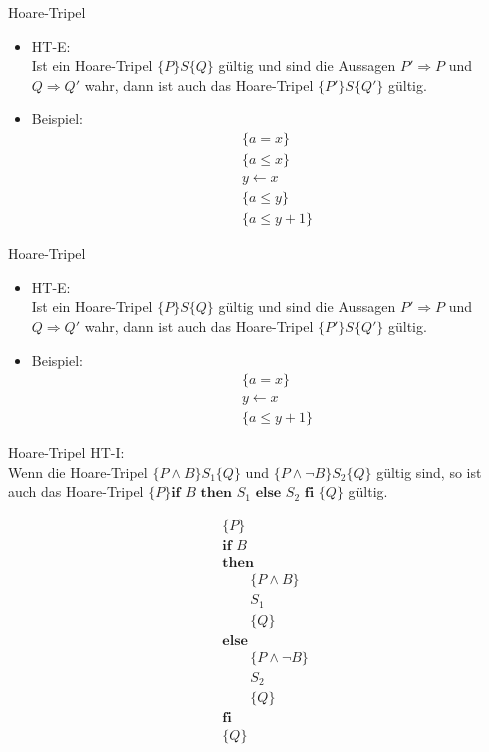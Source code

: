 \begin{frame}{Hoare-Tripel}
  \begin{itemize}
    \item HT-E:\\
      Ist ein Hoare-Tripel $\{P\}S\{Q\}$ gültig und sind die
      Aussagen $P' \Rightarrow P$ und $Q\Rightarrow Q'$ wahr, dann ist auch das
      Hoare-Tripel $\{P'\}S\{Q'\}$ gültig.
    \item Beispiel: \\
      \begin{align*}
        &\{a =x\}\\
        &\{a\le x\}\\
        &y\leftarrow x\\
        &\{a\le y\}\\
        &\{a\le y+1\}
      \end{align*}
  \end{itemize}
\end{frame}

\begin{frame}{Hoare-Tripel}
  \begin{itemize}
    \item HT-E:\\
      Ist ein Hoare-Tripel $\{P\}S\{Q\}$ gültig und sind die
      Aussagen $P' \Rightarrow P$ und $Q\Rightarrow Q'$ wahr, dann ist auch das
      Hoare-Tripel $\{P'\}S\{Q'\}$ gültig.
    \item Beispiel: \\
      \begin{align*}
        &\{a =x\}\\
        &y\leftarrow x\\
        &\{a\le y+1\}
      \end{align*}
  \end{itemize}
\end{frame}

\begin{frame}{Hoare-Tripel}
  HT-I:\\
  Wenn die Hoare-Tripel $\{P \land B\}S_1\{Q\}$ und $\{P \land \lnot B\}S_2\{Q\}$ gültig sind, so ist auch das Hoare-Tripel $\{P\} \textbf{if } B \textbf{ then }S_1\textbf{ else }S_2\textbf{ fi }\{Q\}$ gültig.
\end{frame}

\begin{frame}
  \begin{align*}
    &\{P\}\\
    &\textbf{if } B\\
    &\textbf{then}\\
    & \qquad \{P\land B\}\\
    & \qquad S_1\\
    & \qquad \{Q\}\\
    &\textbf{else}\\
    & \qquad \{P\land \lnot B\}\\
    & \qquad S_2\\
    & \qquad \{Q\}\\
    &\textbf{fi}\\
    &\{Q\}
  \end{align*}
\end{frame}


